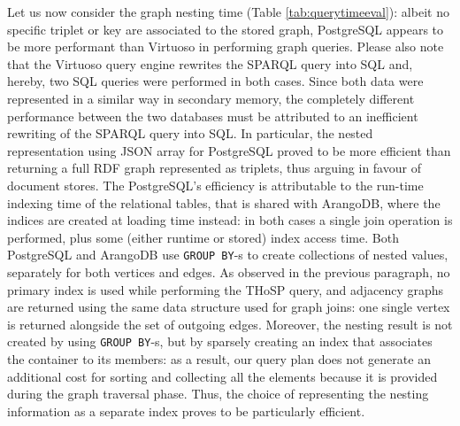 Let us now consider the graph nesting time (Table \ref{tab:querytimeeval}): albeit no specific triplet or key are associated to the stored graph, PostgreSQL appears to be more performant than Virtuoso in performing graph queries. Please also note that the Virtuoso query engine rewrites the SPARQL query into SQL and, hereby, two SQL queries were performed in both cases. Since both data were represented in a similar way in secondary memory, the completely different performance between the two databases must be attributed  to an inefficient rewriting of the SPARQL query into SQL. In particular, the nested representation using JSON array for PostgreSQL proved to be more efficient than returning a full RDF graph represented as triplets, thus arguing in favour of document stores. The PostgreSQL's efficiency is attributable to the run-time indexing time of the relational tables, that is shared with ArangoDB, where the indices are created at loading time instead: in both cases a single join operation is performed, plus some (either runtime or stored) index access time. Both PostgreSQL and ArangoDB use \texttt{GROUP BY}-s to create collections of nested values, separately for both vertices and edges. As observed in the previous paragraph, no primary index is used while performing the THoSP query, and adjacency graphs are returned using the same data structure used for graph joins: one single vertex is returned alongside the set of outgoing edges. Moreover, the nesting result is not created by using \texttt{GROUP BY}-s, but by sparsely creating an index that associates the container to its members: as a result, our query plan does not generate an additional cost for sorting and collecting all the elements because it is provided during the graph traversal phase. Thus, the choice of representing the nesting information as a separate index proves to be particularly efficient.

